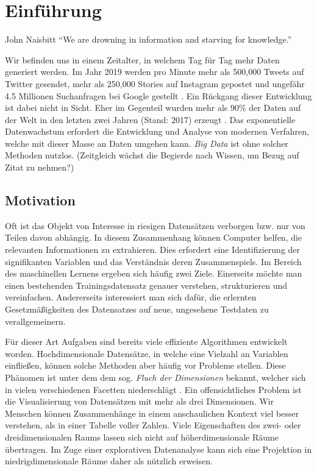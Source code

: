 \chapter{Einführung}

\label{introduction}

\begin{chapquote}{John Naisbitt}
``We are drowning in information and starving for knowledge.''
\end{chapquote}

Wir befinden uns in einem Zeitalter, in welchem Tag für Tag mehr Daten generiert werden. Im Jahr 2019 werden pro Minute mehr als 500,000 Tweets auf Twitter gesendet, mehr als 250,000 Stories auf Instagram gepostet und ungefähr 4.5 Millionen Suchanfragen bei Google gestellt \cite{domo}. Ein Rückgang dieser Entwicklung ist dabei nicht in Sicht. Eher im Gegenteil wurden mehr als 90\% der Daten auf der Welt in den letzten zwei Jahren (Stand: 2017) erzeugt \cite{ibm}. Das exponentielle Datenwachstum erfordert die Entwicklung und Analyse von modernen Verfahren, welche mit dieser Masse an Daten umgehen kann. \textit{Big Data} ist ohne solcher Methoden nutzlos. (Zeitgleich wächst die Begierde nach Wissen, um Bezug auf Zitat zu nehmen?)
 
 


\section{Motivation}

Oft ist das Objekt von Interesse in riesigen Datensätzen verborgen bzw. nur von Teilen davon abhängig. In diesem Zusammenhang können Computer helfen, die relevanten Informationen zu extrahieren. Dies erfordert eine Identifizierung der signifikanten Variablen und das Verständnis deren Zusammenspiels. Im Bereich des maschinellen Lernens ergeben sich häufig zwei Ziele. Einerseits möchte man einen bestehenden Trainingsdatensatz genauer verstehen, strukturieren und vereinfachen. Andererseits interessiert man sich dafür, die erlernten Gesetzmäßigkeiten des Datensatzes auf neue, ungesehene Testdaten zu verallgemeinern. 

Für dieser Art Aufgaben sind bereits viele effiziente Algorithmen entwickelt worden. Hochdimensionale Datensätze, in welche eine Vielzahl an Variablen einfließen, können solche Methoden aber häufig vor Probleme stellen. Diese Phänomen ist unter dem dem sog. \textit{Fluch der Dimensionen} bekannt, welcher sich in vielen verschiedenen Facetten niederschlägt \cite{bellman}. Ein offensichtliches Problem ist die Visualisierung von Datensätzen mit mehr als drei Dimensionen. Wir Menschen können Zusammenhänge in einem anschaulichen Kontext viel besser verstehen, als in einer Tabelle voller Zahlen. Viele Eigenschaften des zwei- oder dreidimensionalen Raums lassen sich nicht auf höherdimensionale Räume übertragen. Im Zuge einer explorativen Datenanalyse kann sich eine Projektion in niedrigdimensionale Räume daher als nützlich erweisen.

